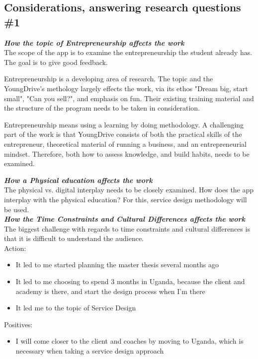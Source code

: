 \subsection{Considerations, answering research questions \#1}

\textbf{\textit{How the topic of Entrepreneurship affects the work}}\\
The scope of the app is to examine the entrepreneurship the student already has. The goal is to give good feedback.

Entrepreneurship is a developing area of research. The topic and the YoungDrive's methology largely effects the work, via its ethos "Dream big, start small", "Can you sell?", and emphasis on fun. Their existing training material and the structure of the program needs to be taken in consideration.

Entrepreneurship means using a learning by doing methodology. A challenging part of the work is that YoungDrive consists of both the practical skills of the entrepreneur, theoretical material of running a business, and an entrepreneurial mindset. Therefore, both how to assess knowledge, and build habits, needs to be examined. 

\textbf{\textit{How a Physical education affects the work}}\\
The physical vs. digital interplay needs to be closely examined. How does the app interplay with the physical education? For this, service design methodology will be used. \\

\textbf{\textit{How the Time Constraints and Cultural Differences affects the work}}\\

The biggest challenge with regards to time constraints and cultural differences is that it is difficult to understand the audience.\\

Action:
\begin{itemize}
    \item It led to me started planning the master thesis several months ago
    \item It led to me choosing to spend 3 months in Uganda, because the client and academy is there, and start the design process when I'm there
    \item It led me to the topic of Service Design
\end{itemize}

Positives:
\begin{itemize}
    \item I will come closer to the client and coaches by moving to Uganda, which is necessary when taking a service design approach
\end{itemize}


